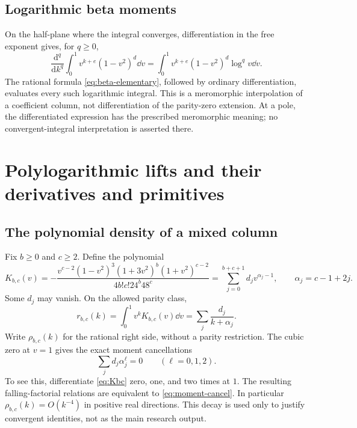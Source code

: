 \documentclass[11pt,letterpaper]{article}
\numberwithin{equation}{section}
\theoremstyle{plain}
\theoremstyle{definition}
\theoremstyle{remark}
\begin{document}
\subsection{Logarithmic beta moments}

On the half-plane where the integral converges, differentiation in the free exponent gives, for $q\ge0$,
\begin{equation}\label{eq:logbeta}
 \frac{\mathrm d^q}{\mathrm dk^q}
 \int_0^1v^{k+e}(1-v^2)^d\dd v
 =\int_0^1v^{k+e}(1-v^2)^d\log^qv\dd v.
\end{equation}
The rational formula \eqref{eq:beta-elementary}, followed by ordinary differentiation, evaluates every such logarithmic integral. This is a meromorphic interpolation of a coefficient column, not differentiation of the parity-zero extension. At a pole, the differentiated expression has the prescribed meromorphic meaning; no convergent-integral interpretation is asserted there.



\section{Polylogarithmic lifts and their derivatives and primitives}
\label{sec:polylogs}

\subsection{The polynomial density of a mixed column}

Fix $b\ge0$ and $c\ge2$. Define the polynomial
\begin{equation}\label{eq:Kbc}
 K_{b,c}(v)=
 -\frac{v^{c-2}(1-v^2)^3(1+3v^2)^b(1+v^2)^{c-2}}
 {4b!c!24^b48^c}
 =\sum_{j=0}^{b+c+1}d_jv^{\alpha_j-1},
 \qquad \alpha_j=c-1+2j.
\end{equation}
Some $d_j$ may vanish. On the allowed parity class,
\begin{equation}\label{eq:rho}
 r_{b,c}(k)=\int_0^1v^kK_{b,c}(v)\dd v
          =\sum_j\frac{d_j}{k+\alpha_j}.
\end{equation}
Write $\rho_{b,c}(k)$ for the rational right side, without a parity restriction. The cubic zero at $v=1$ gives the exact moment cancellations
\begin{equation}\label{eq:moment-cancel}
 \sum_jd_j\alpha_j^\ell=0\qquad(\ell=0,1,2).
\end{equation}
To see this, differentiate \eqref{eq:Kbc} zero, one, and two times at $1$. The resulting falling-factorial relations are equivalent to \eqref{eq:moment-cancel}. In particular $\rho_{b,c}(k)=O(k^{-4})$ in positive real directions. This decay is used only to justify convergent identities, not as the main research output.
\end{document}
